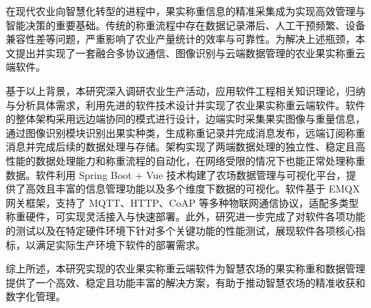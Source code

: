 在现代农业向智慧化转型的进程中，果实称重信息的精准采集成为实现高效管理与智能决策的重要基础。传统的称重流程中存在数据记录滞后、人工干预频繁、设备兼容性差等问题，严重影响了农业产量统计的效率与可靠性。为解决上述瓶颈，本文提出并实现了一套融合多协议通信、图像识别与云端数据管理的农业果实称重云端软件。

基于以上背景，本研究深入调研农业生产活动，应用软件工程相关知识理论，归纳与分析具体需求，利用先进的软件技术设计并实现了农业果实称重云端软件。软件的整体架构采用远边端协同的模式进行设计，边端实时采集果实图像与重量信息，通过图像识别模块识别出果实种类，生成称重记录并完成消息发布，远端订阅称重消息并完成后续的数据处理与存储。架构实现了两端数据处理的独立性、稳定且高性能的数据处理能力和称重流程的自动化，在网络受限的情况下也能正常处理称重数据。软件利用 Spring Boot + Vue 技术构建了农场数据管理与可视化平台，提供了高效且丰富的信息管理功能以及多个维度下数据的可视化。软件基于 EMQX 网关框架，支持了 MQTT、HTTP、CoAP 等多种物联网通信协议，适配多类型称重硬件，可实现灵活接入与快速部署。此外，研究进一步完成了对软件各项功能的测试以及在特定硬件环境下针对多个关键功能的性能测试，展现软件各项核心指标，以满足实际生产环境下软件的部署需求。

综上所述，本研究实现的农业果实称重云端软件为智慧农场的果实称重和数据管理提供了一个高效、稳定且功能丰富的解决方案，有助于推动智慧农场的精准收获和数字化管理。 
